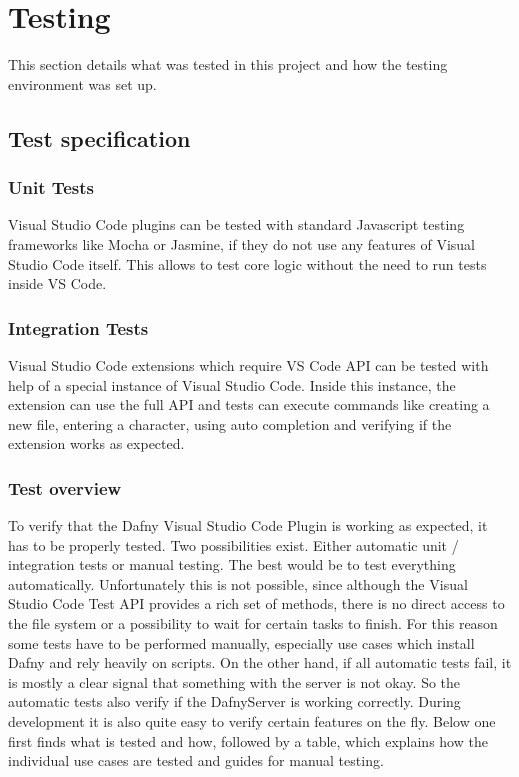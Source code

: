 \section{Testing}
This section details what was tested in this project and how the testing environment was set up.
\subsection{Test specification}
\subsubsection{Unit Tests}
Visual Studio Code plugins can be tested with standard Javascript testing frameworks like Mocha or Jasmine, if they do not use any features of Visual Studio Code itself. This allows to test core logic without the need to run tests inside VS Code.
\subsubsection{Integration Tests}
Visual Studio Code extensions which require VS Code API can be tested with help of a special instance of Visual Studio Code. Inside this instance, the extension can use the full API and tests can execute commands like creating a new file, entering a character, using auto completion and verifying if the extension works as expected.   
\subsubsection{Test overview}
To verify that the Dafny Visual Studio Code Plugin is working as expected, it has to be properly tested. Two possibilities exist. Either automatic unit / integration tests or manual testing. The best would be to test everything automatically. Unfortunately this is not possible, since although the Visual Studio Code Test API provides a rich set of methods, there is no direct access to the file system or a possibility to wait for certain tasks to finish. For this reason some tests have to be performed manually, especially use cases which install Dafny and rely heavily on scripts. On the other hand, if all automatic tests fail, it is mostly a clear signal that something with the server is not okay. So the automatic tests also verify if the DafnyServer is working correctly. During development it is also quite easy to verify certain features on the fly. 
Below one first finds what is tested and how, followed by a table, which explains how the individual use cases are tested and guides for manual testing. 
